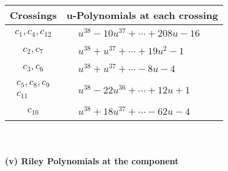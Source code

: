 \documentclass[1p]{elsarticle_modified}
\theoremstyle{definition}
\begin{document}
\begin{tabular}{m{50pt}|m{274pt}}
Crossings & \hspace{64pt}u-Polynomials at each crossing \\
\hline $$\begin{aligned}c_{1},c_{4},c_{12}\end{aligned}$$&$\begin{aligned}
&u^{38}-10 u^{37}+\cdots+208 u-16
\end{aligned}$\\
\hline $$\begin{aligned}c_{2},c_{7}\end{aligned}$$&$\begin{aligned}
&u^{38}+u^{37}+\cdots+19 u^2-1
\end{aligned}$\\
\hline $$\begin{aligned}c_{3},c_{6}\end{aligned}$$&$\begin{aligned}
&u^{38}+u^{37}+\cdots-8 u-4
\end{aligned}$\\
\hline $$\begin{aligned}c_{5},c_{8},c_{9}\\c_{11}\end{aligned}$$&$\begin{aligned}
&u^{38}-22 u^{36}+\cdots+12 u+1
\end{aligned}$\\
\hline $$\begin{aligned}c_{10}\end{aligned}$$&$\begin{aligned}
&u^{38}+18 u^{37}+\cdots-62 u-4
\end{aligned}$\\
\hline
\end{tabular}\\~\\
\newpage\renewcommand{\arraystretch}{1}
\flushleft \textbf{(v) Riley Polynomials at the component}\newline \\
\end{document}
